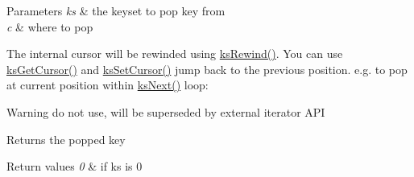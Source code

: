 \begin{DoxyParams}{Parameters}
{\em ks} & the keyset to pop key from \\
\hline
{\em c} & where to pop\\
\hline
\end{DoxyParams}
The internal cursor will be rewinded using \mbox{\hyperlink{group__keyset_gabe793ff51f1728e3429c84a8a9086b70}{ks\+Rewind()}}. You can use \mbox{\hyperlink{group__keyset_gaffe507ab9281c322eb16c3e992075d29}{ks\+Get\+Cursor()}} and \mbox{\hyperlink{group__keyset_gad94c9ffaa3e8034564c0712fd407c345}{ks\+Set\+Cursor()}} jump back to the previous position. e.\+g. to pop at current position within \mbox{\hyperlink{group__keyset_ga317321c9065b5a4b3e33fe1c399bcec9}{ks\+Next()}} loop\+: 
\begin{DoxyCode}{0}
\end{DoxyCode}


\begin{DoxyWarning}{Warning}
do not use, will be superseded by external iterator A\+PI
\end{DoxyWarning}
\begin{DoxyReturn}{Returns}
the popped key 
\end{DoxyReturn}

\begin{DoxyRetVals}{Return values}
{\em 0} & if ks is 0 \\
\hline
\end{DoxyRetVals}
